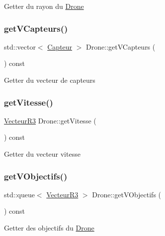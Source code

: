 Getter du rayon du \mbox{\hyperlink{class_drone}{Drone}} \mbox{\label{class_drone_a0fb2eb8aa87f70b8f6d251f7b28feea4}} 
\subsubsection{\texorpdfstring{get\+V\+Capteurs()}{getVCapteurs()}}
{\footnotesize\ttfamily std\+::vector$<$ \mbox{\hyperlink{class_capteur}{Capteur}} $>$ Drone\+::get\+V\+Capteurs (\begin{DoxyParamCaption}{ }\end{DoxyParamCaption}) const}

Getter du vecteur de capteurs \mbox{\label{class_drone_a4b6a219813286c95545bccdf061a5f48}} 
\subsubsection{\texorpdfstring{get\+Vitesse()}{getVitesse()}}
{\footnotesize\ttfamily \mbox{\hyperlink{class_vecteur_r3}{Vecteur\+R3}} Drone\+::get\+Vitesse (\begin{DoxyParamCaption}{ }\end{DoxyParamCaption}) const}

Getter du vecteur vitesse \mbox{\label{class_drone_a11c5ec4c9211f217b2f0b11f46a1e627}} 
\subsubsection{\texorpdfstring{get\+V\+Objectifs()}{getVObjectifs()}}
{\footnotesize\ttfamily std\+::queue$<$ \mbox{\hyperlink{class_vecteur_r3}{Vecteur\+R3}} $>$ Drone\+::get\+V\+Objectifs (\begin{DoxyParamCaption}{ }\end{DoxyParamCaption}) const}

Getter des objectifs du \mbox{\hyperlink{class_drone}{Drone}} \mbox{\label{class_drone_ae7249a3f0c054e2c1beb6ea522774029}} 
